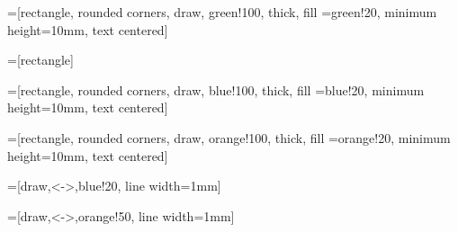 \documentclass{article}
\begin{document}
=[rectangle, rounded corners, draw, green!100, thick, %
fill =green!20, minimum height=10mm,%
text centered]

=[rectangle]

=[rectangle, rounded corners, draw, blue!100, thick, %
fill =blue!20, minimum height=10mm,%
text centered]

=[rectangle, rounded corners, draw, orange!100, thick, %
fill =orange!20, minimum height=10mm,%
text centered]

=[draw,<->,blue!20, line width=1mm]

=[draw,<->,orange!50, line width=1mm]

\end{document}
